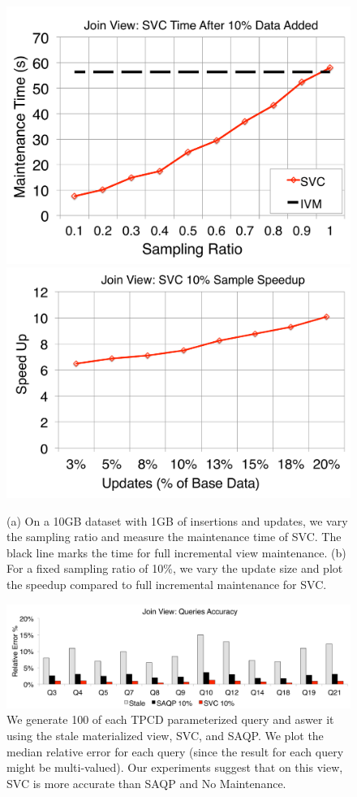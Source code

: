 \begin{figure}[t]
\centering
\includegraphics[scale=0.25]{exp/msj_1.pdf}
\includegraphics[scale=0.25]{exp/msj_2.pdf}
 \caption{(a) On a 10GB dataset with 1GB of insertions and updates, we vary the sampling ratio and measure the maintenance time of SVC. The black line marks the time for full incremental view maintenance. (b) For a fixed sampling ratio of 10\%, we vary the update size and plot the speedup compared to full incremental maintenance for SVC. \label{exp-1-samplesize}}
\end{figure}

\begin{figure}[t]
\centering
\includegraphics[scale=0.16]{exp/msj_3.pdf}
 \caption{We generate 100 of each TPCD parameterized query and aswer it using the stale materialized view, SVC, and SAQP. We plot the median relative error for each query (since the result for each query might be multi-valued). Our experiments suggest that on this view, SVC is more accurate than SAQP and No Maintenance.\label{exp-1-acc}}
\end{figure}

